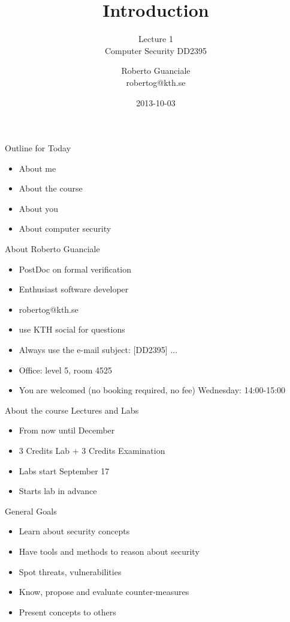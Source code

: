 \documentclass{beamer}
\title{Introduction}
\subtitle{Lecture 1 \\ Computer Security DD2395}
\author[R. Guanciale]{
  Roberto Guanciale\\
  robertog@kth.se
}
\date{2013-10-03}
\begin{document}
\begin{frame}[plain]
  \titlepage
\end{frame}

\begin{frame}{Outline for Today}
  \begin{itemize}
    \item About me
    \item About the course
    \item About you
    \item About computer security
  \end{itemize}
\end{frame}

\begin{frame}{About Roberto Guanciale}
  \begin{itemize}
    \item PostDoc on formal verification
    \item Enthusiast software developer
    \item robertog@kth.se
    \item use KTH social for questions
    \item \alert{Always} use the e-mail subject: [DD2395] ...
    \item Office: level 5, room 4525
    \item You are welcomed (no booking required, no fee) Wednesday:
      14:00-15:00
  \end{itemize}
\end{frame}

\begin{frame}{About the course}
  Lectures and Labs
  \begin{itemize}
    \item From now until December
    \item 3 Credits Lab + 3 Credits Examination
    \item Labs start September 17
    \item Starts lab in advance
  \end{itemize}
\end{frame}

\begin{frame}{General Goals}
  \begin{itemize}
    \item Learn about security concepts
    \item Have tools and methods to reason about security
    \item Spot threats, vulnerabilities
    \item Know, propose and evaluate counter-measures
    \item Present concepts to others 
  \end{itemize}
\end{frame}
\end{document}
